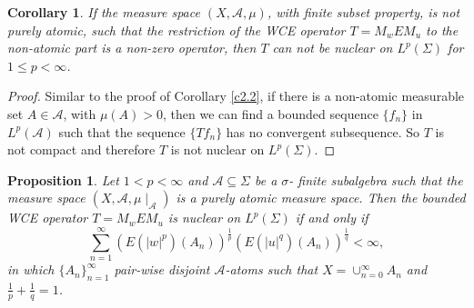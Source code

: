 \documentclass{amsart}
\newtheorem{cor}[thm]{Corollary}
\newtheorem{prop}[thm]{Proposition}
\theoremstyle{definition}\newtheorem{defn}[thm]{Definition}
\theoremstyle{remark}
\numberwithin{equation}{section}
\begin{document}
\begin{cor}\label{c2.4}
If the measure space $(X, \mathcal{A}, \mu)$, with finite subset property, is not purely atomic, such that the restriction of the WCE operator $T=M_wEM_u$ to the non-atomic part is a non-zero operator, then $T$ can not be nuclear on $L^p(\Sigma)$ for $1\leq p<\infty$.
\end{cor}
\begin{proof}
Similar to the proof of Corollary \ref{c2.2}, if there is a non-atomic measurable set $A\in \mathcal{A}$, with $\mu(A)>0$, then we can find a bounded sequence $\{f_n\}$ in
$L^p(\mathcal{A})$ such that the sequence $\{Tf_n\}$ has no convergent subsequence. So $T$ is not compact and therefore $T$ is not nuclear on $L^p(\Sigma)$.
\end{proof}

\begin{prop}\label{p2.5}
Let $1<p<\infty$ and $\mathcal{A}\subseteq \Sigma$ be a $\sigma$- finite subalgebra such that the measure space $(X, \mathcal{A}, \mu\mid_{\mathcal{A}})$ is a purely atomic measure space. Then the bounded WCE operator $T=M_wEM_u$ is nuclear on $L^p(\Sigma)$ if and only if
$$\sum^{\infty}_{n=1}(E(|w|^{p})(A_n))^{\frac{1}{p}}(E(|u|^{q})(A_n))^{\frac{1}{q}}<\infty,$$
in which $\{A_n\}^{\infty}_{n=1}$ pair-wise disjoint $\mathcal{A}$-atoms such that $X=\cup^{\infty}_{n=0}A_n$ and $\frac{1}{p}+\frac{1}{q}=1$.
\end{prop}
\end{document}
